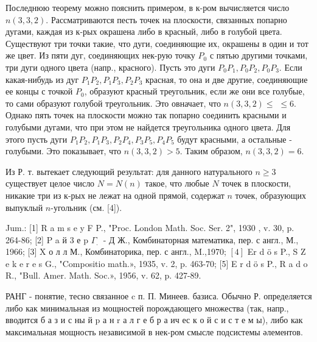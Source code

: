 \documentclass[10pt]{article}
\begin{document}
Последнюю теорему можно пояснить примером, в к-ром вычисляется число $n(3,3,2)$. Рассматриваются песть точек на плоскости, связанных попарно дугами, каждая из к-рых окрашена либо в красный, либо в голубой цвета. Существуют три точки такие, что дуги, соединяющие их, окрашены в один и тот же цвет. Из пяти дуг, соединяющих нек-рую точку $P_{0}$ с пятью другими точками, три дуги одного цвета (напр., красного). Пусть это дуги $P_{0} P_{1}, P_{0} P_{2}, P_{0} P_{3}$. Если какая-нибудь из дуг $P_{1} P_{2}, P_{1} P_{3}, P_{2} P_{3}$ красная, то она и две другие, соединяющие ее концы с точкой $P_{0}$, образуют красный треугольник, если же они все голубые, то сами образуют голубой треугольник. Это овначает, что $n(3,3,2) \leqslant$ $\leqslant 6$. Однако пять точек на плоскости можно так попарно соединить красными и голубыми дугами, что при этом не найдется треугольника одного цвета. Для этого пусть дуги $P_{1} P_{2}, P_{1} P_{3}, P_{2} P_{4}, P_{3} P_{5}, P_{4} P_{5}$ будут красными, а остальные - голубыми. Это показывает, что $n(3,3,2)>5$. Таким образом, $n(3,3,2)=6$.



Из Р. т. вытекает следующий результат: для данного натурального $n \geqslant 3$ существует целое число $N=N(n)$ такое, что любые $N$ точек в плоскости, никакие три из к-рых не лежат на одной прямой, содержат $n$ точек, образующих выпуклый $n$-угольник (см. [4]).



Jum.: [1] R a m s e y F P., "Proc. London Math. Soc. Ser. 2", 1930 , v. 30, p. 264-86; [2] P a й 3 е p $\Gamma_{\text {. }}$ - Д Ж., Комбинаторная математика, пер. с англ., М., 1966; [3] X о л л М., Комбинаторика, пер. с англ., M.,1970; $[4]$ Er d ö s P., S Z e k e r e s G., "Compositio math.», 1935, v. 2, p. 463-70; [5] E r d ö s P., R a d o R., "Bull. Amer. Math. Soc.», 1956, v. 62, p. 427-89.



РАНГ - понятие, тесно связанное $\mathrm{c}$ п. П. Минеев. базиса. Обычно Р. определяется либо как минимальная из мощностей порождающего множества (так, напр., вводится б а з и с ны й $\mathrm{p}$ а н $\mathrm{r}$ а л г е б р а ич ес к о й с и с т е м ы), либо как максимальная мощность независимой в нек-ром смысле подсистемы әлементов.
\end{document}
